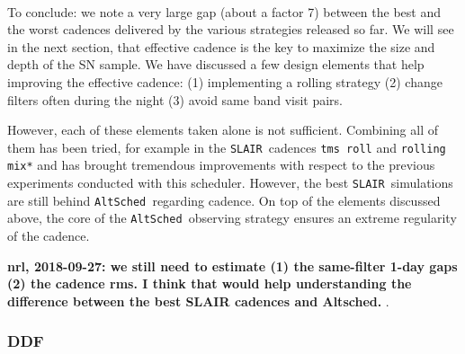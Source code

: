 \documentclass [11pt,a4paper]{article}
\newcommand{\FixMe}[1]{{\color{red} \bf \large #1}}
\newcommand{\slair}{{\tt SLAIR\ }}
\newcommand{\altsched}{{\tt AltSched\ }}
\begin{document}
\paragraph{} To conclude: we note a very large gap (about a factor 7) between
the best and the worst cadences delivered by the various strategies
released so far.  We will see in the next section, that effective
cadence is the key to maximize the size and depth of the SN sample.
We have discussed a few design elements that help improving the effective
cadence: (1) implementing a rolling strategy (2) change filters often
during the night (3) avoid same band visit pairs.

However, each of these elements taken alone is not
sufficient. Combining all of them has been tried, for example in the
\slair cadences {\tt tms\ roll} and {\tt rolling mix*} and has brought
tremendous improvements with respect to the previous experiments
conducted with this scheduler.  However, the best \slair simulations
are still behind \altsched regarding cadence.  On top of the elements
discussed above, the core of the \altsched observing strategy ensures
an extreme regularity of the cadence.

\FixMe{nrl, 2018-09-27: we still need to estimate (1) the same-filter
  1-day gaps (2) the cadence rms. I think that would help
  understanding the difference between the best SLAIR cadences and
  Altsched. }.



\subsubsection{DDF}
\end{document}
